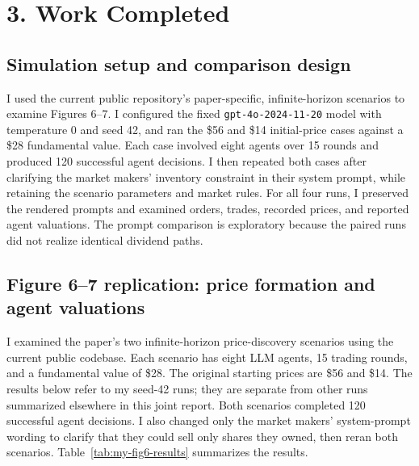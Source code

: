 
\section*{3. Work Completed}
\subsection*{Simulation setup and comparison design}

I used the current public repository's paper-specific, infinite-horizon
scenarios to examine Figures 6--7. I configured the fixed
\texttt{gpt-4o-2024-11-20} model with temperature 0 and seed 42, and ran
the \$56 and \$14 initial-price cases against a \$28 fundamental value.
Each case involved eight agents over 15 rounds and produced 120
successful agent decisions. I then repeated both cases after clarifying
the market makers' inventory constraint in their system prompt, while
retaining the scenario parameters and market rules. For all four runs,
I preserved the rendered prompts and examined orders, trades, recorded
prices, and reported agent valuations. The prompt comparison is
exploratory because the paired runs did not realize identical dividend
paths.

\subsection*{Figure 6--7 replication: price formation and agent valuations}

I examined the paper's two infinite-horizon price-discovery scenarios
using the current public codebase. Each scenario has eight LLM agents,
15 trading rounds, and a fundamental value of \$28. The original
starting prices are \$56 and \$14. The results below refer to my
seed-42 runs; they are separate from other runs summarized elsewhere
in this joint report. Both scenarios completed 120 successful agent
decisions. I also changed only the market makers' system-prompt wording
to clarify that they could sell only shares they owned, then reran
both scenarios. Table~\ref{tab:my-fig6-results} summarizes the results.


